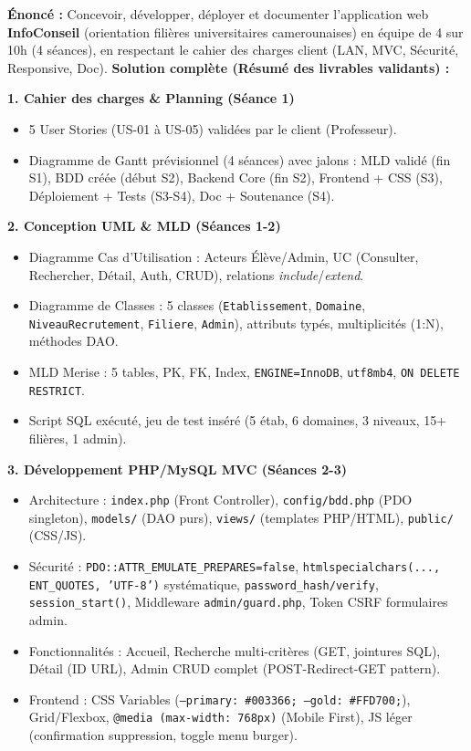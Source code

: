 \documentclass[11pt]{article}
\begin{document}
\begin{exoresolu}
\noindent \textbf{Énoncé :} Concevoir, développer, déployer et documenter l'application web \textbf{InfoConseil} (orientation filières universitaires camerounaises) en équipe de 4 sur 10h (4 séances), en respectant le cahier des charges client (LAN, MVC, Sécurité, Responsive, Doc).
\tcblower
\noindent \textbf{Solution complète (Résumé des livrables validants) :}

\textbf{1. Cahier des charges \& Planning (Séance 1)}
\begin{itemize}
    \item 5 User Stories (US-01 à US-05) validées par le client (Professeur).
    \item Diagramme de Gantt prévisionnel (4 séances) avec jalons : MLD validé (fin S1), BDD créée (début S2), Backend Core (fin S2), Frontend + CSS (S3), Déploiement + Tests (S3-S4), Doc + Soutenance (S4).
\end{itemize}

\textbf{2. Conception UML \& MLD (Séances 1-2)}
\begin{itemize}
    \item Diagramme Cas d'Utilisation : Acteurs Élève/Admin, UC (Consulter, Rechercher, Détail, Auth, CRUD), relations \emph{include}/\emph{extend}.
    \item Diagramme de Classes : 5 classes (\texttt{Etablissement}, \texttt{Domaine}, \texttt{NiveauRecrutement}, \texttt{Filiere}, \texttt{Admin}), attributs typés, multiplicités (1:N), méthodes DAO.
    \item MLD Merise : 5 tables, PK, FK, Index, \texttt{ENGINE=InnoDB}, \texttt{utf8mb4}, \texttt{ON DELETE RESTRICT}.
    \item Script SQL exécuté, jeu de test inséré (5 étab, 6 domaines, 3 niveaux, 15+ filières, 1 admin).
\end{itemize}

\textbf{3. Développement PHP/MySQL MVC (Séances 2-3)}
\begin{itemize}
    \item Architecture : \texttt{index.php} (Front Controller), \texttt{config/bdd.php} (PDO singleton), \texttt{models/} (DAO purs), \texttt{views/} (templates PHP/HTML), \texttt{public/} (CSS/JS).
    \item Sécurité : \texttt{PDO::ATTR\_EMULATE\_PREPARES=false}, \texttt{htmlspecialchars(..., ENT\_QUOTES, 'UTF-8')} systématique, \texttt{password\_hash/verify}, \texttt{session\_start()}, Middleware \texttt{admin/guard.php}, Token CSRF formulaires admin.
    \item Fonctionnalités : Accueil, Recherche multi-critères (GET, jointures SQL), Détail (ID URL), Admin CRUD complet (POST-Redirect-GET pattern).
    \item Frontend : CSS Variables (\texttt{--primary: \#003366; --gold: \#FFD700;}), Grid/Flexbox, \texttt{@media (max-width: 768px)} (Mobile First), JS léger (confirmation suppression, toggle menu burger).
\end{itemize}


\end{exoresolu}
\end{document}
